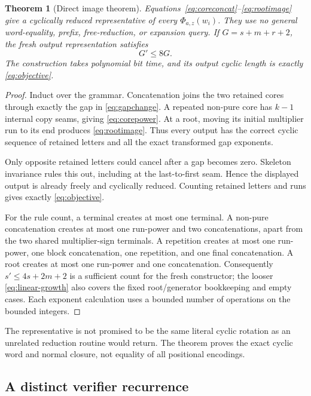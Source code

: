 \documentclass[11pt,letterpaper]{article}
\newtheorem{theorem}{Theorem}[section]
\theoremstyle{definition}
\theoremstyle{remark}\newtheorem{remark}[theorem]{Remark}
\begin{document}
\begin{theorem}[Direct image theorem]
Equations~\eqref{eq:coreconcat}--\eqref{eq:rootimage} give a cyclically reduced
representative of every $\Phi_{a,z}(w_i)$. They use no general word-equality,
prefix, free-reduction, or expansion query. If $G=s+m+r+2$, the fresh output
representation satisfies
\begin{equation}
 G'\le 8G.
 \label{eq:linear-growth}
\end{equation}
The construction takes polynomial bit time, and its output cyclic length is
exactly \eqref{eq:objective}.
\end{theorem}
\begin{proof}
Induct over the grammar. Concatenation joins the two retained cores through
exactly the gap in \eqref{eq:gapchange}. A repeated non-pure core has $k-1$
internal copy seams, giving \eqref{eq:corepower}. At a root, moving its
initial multiplier run to its end produces \eqref{eq:rootimage}. Thus every
output has the correct cyclic sequence of retained letters and all the exact
transformed gap exponents.

Only opposite retained letters could cancel after a gap becomes zero.
Skeleton invariance rules this out, including at the last-to-first seam.
Hence the displayed output is already freely and cyclically reduced.
Counting retained letters and runs gives exactly \eqref{eq:objective}.

For the rule count, a terminal creates at most one terminal. A non-pure
concatenation creates at most one run-power and two concatenations, apart
from the two shared multiplier-sign terminals. A repetition creates at most
one run-power, one block concatenation, one repetition, and one final
concatenation. A root creates at most one run-power and one concatenation.
Consequently $s'\le4s+2m+2$ is a sufficient count for the fresh constructor;
the looser \eqref{eq:linear-growth} also covers the fixed root/generator
bookkeeping and empty cases. Each exponent calculation uses a bounded number
of operations on the bounded integers.
\end{proof}

The representative is not promised to be the same literal cyclic rotation as
an unrelated reduction routine would return. The theorem proves the exact
cyclic word and normal closure, not equality of all positional encodings.

\subsection{A distinct verifier recurrence}
\end{document}
